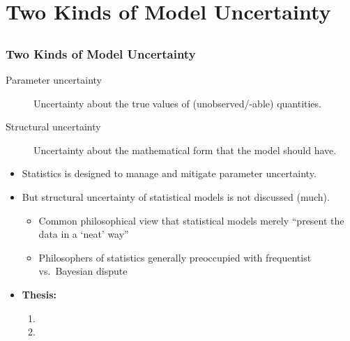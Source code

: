\documentclass{philslides}
\begin{document}
\section{Two Kinds of Model Uncertainty}
\subsection*{}

\frame
{
	\frametitle{Two Kinds of Model Uncertainty}
	\begin{description}
		\item[Parameter uncertainty] Uncertainty about the true values of {\tiny (unobserved/-able)} quantities.  
		\item[Structural uncertainty] Uncertainty about the mathematical form that the model should have.  \autocite[265]{Parker2010}
	\end{description}
	\pause
	\begin{itemize}
		\item Statistics is designed to manage and mitigate parameter uncertainty.  
		\pause
		\item But structural uncertainty of statistical models is not discussed (much).
			\begin{itemize}
			\scriptsize
			\item Common philosophical view that statistical models merely ``present the data in a `neat' way'' \autocite[\S 1.2]{Frigg2017}
			\item Philosophers of statistics generally preoccupied with frequentist vs.~Bayesian dispute
			\end{itemize}
		\pause
		\item \textbf{Thesis:} 
			\begin{enumerate}
			\item {}
			\item {}
			\end{enumerate}
	\end{itemize}
}
\end{document}
